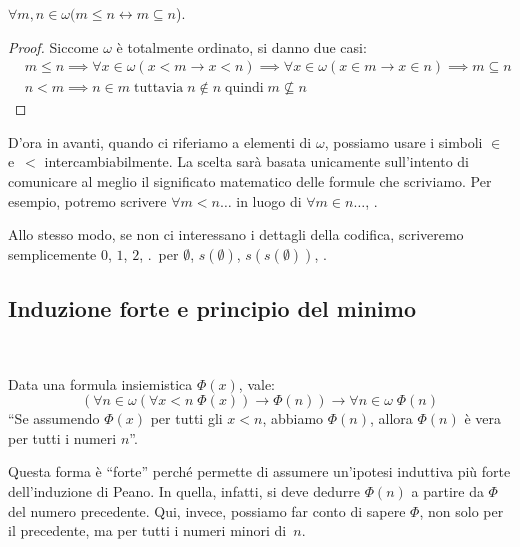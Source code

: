 \begin{corollary}
	$\forall {m,n \in \omega} (m \leq n \leftrightarrow m \subseteq n$).
\end{corollary}

\begin{proof}
	Siccome $\omega$ \`e totalmente ordinato, si danno due casi:
	\begin{align*}
		& m \leq n \implies \forall {x \in \omega} (x < m
\rightarrow x < n) \implies \forall {x \in \omega} (x \in m \rightarrow x \in n) \implies m \subseteq n \\
	    & n < m \implies n \in m \; \text{tuttavia} \; n \not\in n \; \text{quindi} \; m \not\subseteq n
	\end{align*}
\end{proof}

\begin{note}
D'ora in avanti, quando ci riferiamo a elementi di $\omega$, possiamo
usare i simboli $\in$ e~$<$ intercambiabilmente. La scelta sar\`a basata
unicamente sull'intento di comunicare al meglio il significato matematico
delle formule che scriviamo. Per esempio, potremo scrivere $\forall {m<n}
\dotsc$ in luogo di $\forall {m\in n} \dotsc$, \etc.

Allo stesso modo, se non ci interessano i dettagli della codifica,
scriveremo semplicemente $0$, $1$, $2$, \etc.\ per $\emptyset$,
$s(\emptyset)$, $s(s(\emptyset))$, \etc.
\end{note}

\subsection{Induzione forte e principio del minimo}
\ 

\begin{theorem}
	Data una formula insiemistica $\Phi(x)$, vale:
	\[ (\forall {n \in \omega} (\forall {x < n} \; \Phi (x))
\rightarrow \Phi(n)) \rightarrow \forall {n \in \omega} \; \Phi(n)
	\]
	{\drkgrn ``Se assumendo $\Phi(x)$ per tutti gli $x < n$, abbiamo $\Phi(n)$,
allora $\Phi(n)$ \`e vera per tutti i numeri $n$''.}
\end{theorem}

\begin{remark}
	Questa forma \`e ``forte'' perch\'e permette di assumere un'ipotesi induttiva pi\`u forte dell'induzione di Peano. In quella, infatti, si deve dedurre $\Phi(n)$ a 
	partire da $\Phi$ del numero precedente. Qui, invece, possiamo far
conto di sapere $\Phi$, non solo per il precedente, ma per tutti i numeri
minori di~$n$.
\end{remark}

